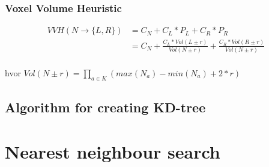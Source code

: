 


\subsubsection{Voxel Volume Heuristic}


\begin{displaymath}
  \begin{array}{rl}
    VVH(N \rightarrow \{L, R\}) &= C_N + C_L * P_L + C_R * P_R \\
    &= C_N + \frac{C_L * Vol(L \pm r)}{Vol(N \pm r)} + 
    \frac{C_R * Vol(R \pm r)}{Vol(N \pm r)} \\
  \end{array}
\end{displaymath}

hvor $Vol(N \pm r) = \prod_{a \in K} (max(N_a) - min(N_a) + 2 * r)$



\subsection{Algorithm for creating KD-tree}




\section{Nearest neighbour search}




